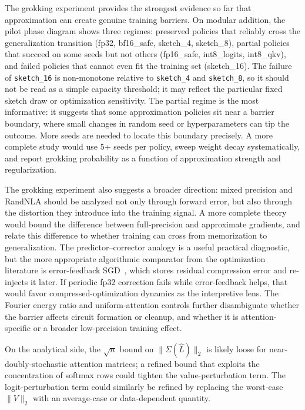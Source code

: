 The grokking experiment provides the strongest evidence so far that approximation can create genuine training barriers. On modular addition, the pilot phase diagram shows three regimes: preserved policies that reliably cross the generalization transition (fp32, bf16\_safe, sketch\_4, sketch\_8), partial policies that succeed on some seeds but not others (fp16\_safe, int8\_logits, int8\_qkv), and failed policies that cannot even fit the training set (sketch\_16). The failure of \texttt{sketch\_16} is non-monotone relative to \texttt{sketch\_4} and \texttt{sketch\_8}, so it should not be read as a simple capacity threshold; it may reflect the particular fixed sketch draw or optimization sensitivity. The partial regime is the most informative: it suggests that some approximation policies sit near a barrier boundary, where small changes in random seed or hyperparameters can tip the outcome. More seeds are needed to locate this boundary precisely. A more complete study would use $5$+ seeds per policy, sweep weight decay systematically, and report grokking probability as a function of approximation strength and regularization.

The grokking experiment also suggests a broader direction: mixed precision and RandNLA should be analyzed not only through forward error, but also through the distortion they introduce into the training signal. A more complete theory would bound the difference between full-precision and approximate gradients, and relate this difference to whether training can cross from memorization to generalization. The predictor--corrector analogy is a useful practical diagnostic, but the more appropriate algorithmic comparator from the optimization literature is error-feedback SGD~\autocite{Stich2019, Alistarh2017}, which stores residual compression error and re-injects it later. If periodic fp32 correction fails while error-feedback helps, that would favor compressed-optimization dynamics as the interpretive lens. The Fourier energy ratio and uniform-attention controls further disambiguate whether the barrier affects circuit formation or cleanup, and whether it is attention-specific or a broader low-precision training effect.

On the analytical side, the $\sqrt{n}$ bound on $\|\Sigma(\widehat{L})\|_2$ is likely loose for near-doubly-stochastic attention matrices; a refined bound that exploits the concentration of softmax rows could tighten the value-perturbation term. The logit-perturbation term could similarly be refined by replacing the worst-case $\|V\|_2$ with an average-case or data-dependent quantity.
